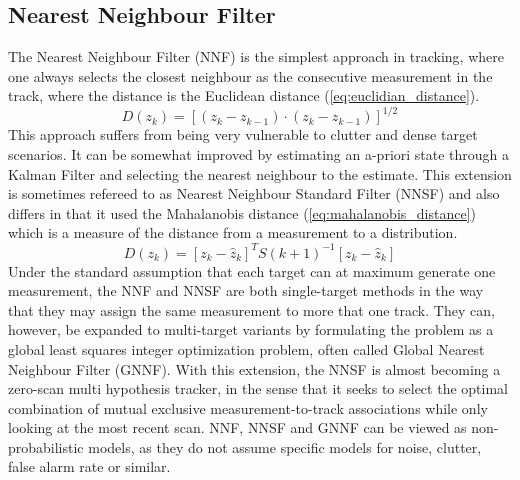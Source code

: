 \subsection{Nearest Neighbour Filter}
\label{sec:nn}
The Nearest Neighbour Filter (NNF) is the simplest approach in tracking, where one always selects the closest neighbour as the consecutive measurement in the track, where the distance is the Euclidean distance (\ref{eq:euclidian_distance}).
\begin{equation}
D(z_k) = \left[ (z_k-z_{k-1}) \cdot (z_k-z_{k-1}) \right]^{1/2}
\label{eq:euclidian_distance}
\end{equation}
This approach suffers from being very vulnerable to clutter and dense target scenarios. It can be somewhat improved by estimating an a-priori state through a Kalman Filter and selecting the nearest neighbour to the estimate. This extension is sometimes refereed to as Nearest Neighbour Standard Filter (NNSF)\cite{Bar-Shalom1998} and also differs in that it used the Mahalanobis distance (\ref{eq:mahalanobis_distance}) which is a measure of the distance from a measurement to a distribution.
\begin{equation}
D(z_k) = \left[ z_k - \hat{z}_{k} \right]^T S(k+1)^{-1} \left[ z_k - \hat{z}_{k} \right]
\label{eq:mahalanobis_distance}
\end{equation}
Under the standard assumption that each target can at maximum generate one measurement, the NNF and NNSF are both single-target methods in the way that they may assign the same measurement to more that one track. They can, however, be expanded to multi-target variants by formulating the problem as a global least squares integer optimization problem, often called Global Nearest Neighbour Filter (GNNF). With this extension, the NNSF is almost becoming a zero-scan multi hypothesis tracker, in the sense that it seeks to select the optimal combination of mutual exclusive measurement-to-track associations while only looking at the most recent scan. NNF, NNSF and GNNF can be viewed as non-probabilistic models, as they do not assume specific models for noise, clutter, false alarm rate or similar.

